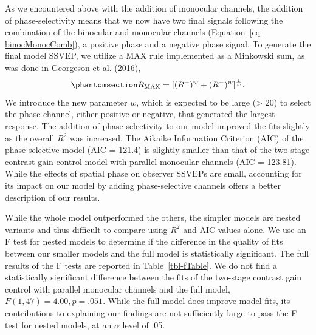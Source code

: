 \documentclass[
  12pt,
]{article}
\begin{document}
As we encountered above with the addition of monocular channels, the
addition of phase-selectivity means that we now have two final signals
following the combination of the binocular and monocular channels
(Equation~\ref{eq-binocMonocComb}), a positive phase and a negative
phase signal. To generate the final model SSVEP, we utilize a MAX rule
implemented as a Minkowski sum, as was done in Georgeson et al. (2016),
\begin{equation}\phantomsection\label{eq-finalSum}{
R_\text{MAX} = [(R^+)^w+(R^-)^w]^{\frac{1}{w}}.
}\end{equation} We introduce the new parameter \(w\), which is expected
to be large (\textgreater{} 20) to select the phase channel, either
positive or negative, that generated the largest response. The addition
of phase-selectivity to our model improved the fits slightly as the
overall \(R^2\) was increased. The Aikaike Information Criterion (AIC)
of the phase selective model (AIC = 121.4) is slightly smaller than that
of the two-stage contrast gain control model with parallel monocular
channels (AIC = 123.81). While the effects of spatial phase on observer
SSVEPs are small, accounting for its impact on our model by adding
phase-selective channels offers a better description of our results.

While the whole model outperformed the others, the simpler models are
nested variants and thus difficult to compare using \(R^2\) and AIC
values alone. We use an F test for nested models to determine if the
difference in the quality of fits between our smaller models and the
full model is statistically significant. The full results of the F tests
are reported in Table~\ref{tbl-fTable}. We do not find a statistically
significant difference between the fits of the two-stage contrast gain
control with parallel monocular channels and the full model,
\(F(1,47) = 4.00, p = .051\). While the full model does improve model
fits, its contributions to explaining our findings are not sufficiently
large to pass the F test for nested models, at an \(\alpha\) level of
.05.
\end{document}
